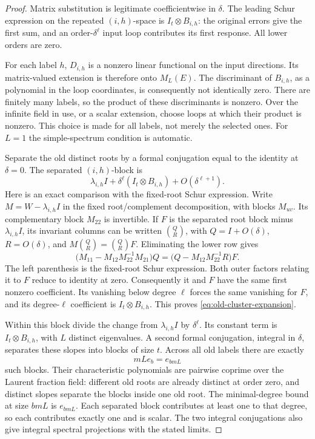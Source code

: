 \begin{proof}
Matrix substitution is legitimate coefficientwise in \(\delta\).
The leading Schur expression on the repeated \((i,h)\)-space is
\(I_t\otimes B_{i,h}\): the original errors give the first sum,
and an order-\(\delta^\ell\) input loop contributes its first
response. All lower orders are zero.

For each label \(h\), \(D_{i,h}\) is a nonzero linear functional
on the input directions. Its matrix-valued extension is therefore
onto \(M_L(E)\). The discriminant of \(B_{i,h}\), as a polynomial
in the loop coordinates, is consequently not identically zero.
There are finitely many labels, so the product of these discriminants
is nonzero. Over the infinite field in use, or a scalar extension,
choose loops at which their product is nonzero. This choice is made
for all labels, not merely the selected ones. For \(L=1\) the
simple-spectrum condition is automatic.

Separate the old distinct roots by a formal conjugation equal to
the identity at \(\delta=0\). The separated \((i,h)\)-block is
\begin{equation}
 \lambda_{i,h}I+\delta^\ell(I_t\otimes B_{i,h})
 +O(\delta^{\ell+1}).
 \label{eq:old-cluster-expansion}
\end{equation}
Here is an exact comparison with the fixed-root Schur expression.
Write \(M=W-\lambda_{i,h}I\) in the fixed root/complement
decomposition, with blocks \(M_{uv}\). Its complementary block
\(M_{22}\) is invertible. If \(F\) is the separated root block
minus \(\lambda_{i,h}I\), its invariant columns can be written
\(\binom QR\), with \(Q=I+O(\delta)\), \(R=O(\delta)\), and
\(M\binom QR=\binom QR F\). Eliminating the lower row gives
\[
 \bigl(M_{11}-M_{12}M_{22}^{-1}M_{21}\bigr)Q
   =\bigl(Q-M_{12}M_{22}^{-1}R\bigr)F.
\]
The left parenthesis is the fixed-root Schur expression. Both
outer factors relating it to \(F\) reduce to identity at zero.
Consequently it and \(F\) have the same first nonzero coefficient.
Its vanishing below degree \(\ell\) forces the same vanishing
for \(F\), and its degree-\(\ell\) coefficient is
\(I_t\otimes B_{i,h}\). This proves
\eqref{eq:old-cluster-expansion}.

Within this block divide the change from \(\lambda_{i,h}I\) by
\(\delta^\ell\). Its constant term is \(I_t\otimes B_{i,h}\),
with \(L\) distinct eigenvalues. A second formal conjugation,
integral in \(\delta\), separates these slopes into blocks of
size \(t\). Across all old labels there are exactly
\[
 mLe_b=e_{bmL}
\]
such blocks. Their characteristic polynomials are pairwise coprime
over the Laurent fraction field: different old roots are already
distinct at order zero, and distinct slopes separate the blocks
inside one old root. The minimal-degree bound at size \(bmL\)
is \(e_{bmL}\). Each separated block contributes at least one
to that degree, so each contributes exactly one and is scalar.
The two integral conjugations also give integral spectral
projections with the stated limits.
\end{proof}

